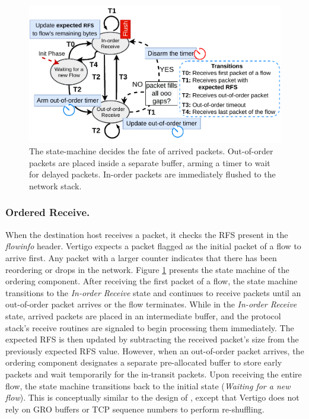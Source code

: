 \begin{figure}[t]
	\centering
	\includegraphics[width=0.75
	\textwidth]{figs/reordering_state_machine.pdf}
	\vspace{-2mm}
	\caption{\small{The state-machine decides the fate of arrived packets. Out-of-order packets are placed inside a separate buffer, arming a timer to wait for delayed packets. In-order packets are immediately flushed to the network stack.}}
	\label{fig:state_machine}
		\vspace{-2mm}
\end{figure}

\subsubsection{Ordered Receive.}
When the destination host receives a packet, it checks the RFS present in the \textit{flowinfo} header. Vertigo expects a packet flagged as the initial packet of a flow to arrive first. Any packet with a larger counter indicates that there has been reordering or drops in the network. Figure \ref{fig:state_machine} presents the state machine of the ordering component. After receiving the first packet of a flow, the state machine transitions to the \textit{In-order Receive} state and continues to receive packets until an out-of-order packet arrives or the flow terminates. While in the \textit{In-order Receive} state, arrived packets are placed in an intermediate buffer, and the protocol stack's receive routines are signaled to begin processing them immediately. The expected RFS is then updated by subtracting the received packet's size from the previously expected RFS value.
However, when an out-of-order packet arrives, the ordering component designates a separate pre-allocated buffer to store early packets and wait temporarily for the in-transit packets. Upon receiving the entire flow, the state machine transitions back to the initial state (\textit{Waiting for a new flow}). This is conceptually similar to the design of \cite{juggler}, except that Vertigo does not rely on GRO buffers or TCP sequence numbers to perform re-shuffling.


